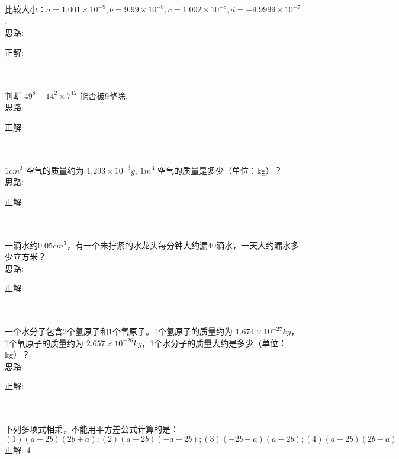 \item {
    比较大小：$a=1.001\times 10^{-9}, b=9.99\times 10^{-8}, c=1.002\times 10^{-8}, d=-9.9999\times 10^{-7} $.
    \ifshowSolution
        \fangsong{}
        \\
        思路:

        正解: 
    \else
        \\ \\ \\
    \fi
}

\item {
    判断 $49^{8} - 14^{2}\times 7^{12} $ 能否被9整除.
    \ifshowSolution
        \fangsong{}
        \\
        思路:

        正解: 
    \else
        \\ \\ \\
    \fi
}

\item {
    $1 cm^3$ 空气的质量约为  $1.293\times 10^{-3} g$, $1 m^3$ 空气的质量是多少（单位：kg）？
    \ifshowSolution
        \fangsong{}
        \\
        思路:

        正解: 
    \else
        \\ \\ \\
    \fi
}

\item {
    一滴水约$0.05 cm^3$，有一个未拧紧的水龙头每分钟大约漏40滴水，一天大约漏水多少立方米？
    \ifshowSolution
        \fangsong{}
        \\
        思路:

        正解: 
    \else
        \\ \\ \\
    \fi
}

\item {
    一个水分子包含2个氢原子和1个氧原子。1个氢原子的质量约为 $1.674\times 10^{-27} kg$，1个氧原子的质量约为 $2.657\times 10^{-26} kg$，1个水分子的质量大约是多少（单位：kg）？
    \ifshowSolution
        \fangsong{}
        \\
        思路:

        正解: 
    \else
        \\ \\ \\
    \fi
}

\item {
    下列多项式相乘，不能用平方差公式计算的是：$(1) (a-2b)(2b+a); (2) (a-2b)(-a-2b); (3) (-2b-a)(a-2b); (4) (a-2b)(2b-a)$
    \ifshowSolution
        \fangsong{}
        \\
        正解: 4
    \else
        \\ \\ \\
    \fi
}



